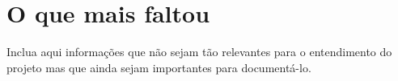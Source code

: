 \chapter{O que mais faltou}

Inclua aqui informações que não sejam tão relevantes para o entendimento do projeto mas que ainda sejam importantes para documentá-lo. 